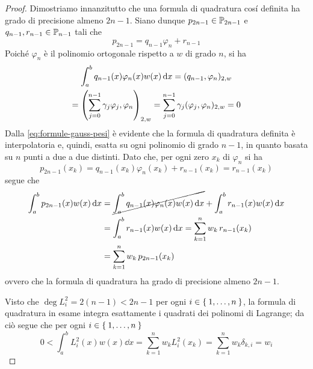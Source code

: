 	\begin{proof}
		Dimostriamo innanzitutto che una formula di quadratura cosí definita ha grado di precisione almeno \(2 n - 1\). Siano dunque \(p_{2 n - 1} \in \P_{2 n - 1}\) e \(q_{n - 1}, r_{n - 1} \in \P_{n - 1}\) tali che
		\begin{equation*}
			p_{2 n - 1} = q_{n - 1} \varphi_n + r_{n - 1}
		\end{equation*}
		Poiché \(\varphi_n\) è il polinomio ortogonale rispetto a \(w\) di grado \(n\), si ha
		\begin{multline*}
			\int_a^b q_{n - 1} (x) \varphi_n (x) w (x) \dd{x} = (q_{n - 1}, \varphi_n)_{2, w} \\
			= \qty(\sum_{j = 0}^{n - 1} \gamma_j \varphi_j, \varphi_n)_{2, w} = \sum_{j = 0}^{n - 1} \gamma_j (\varphi_j, \varphi_n)_{2, w} = 0
		\end{multline*}
		Dalla \eqref{eq:formule-gauss-pesi} è evidente che la formula di quadratura definita è interpolatoria e, quindi, esatta su ogni polinomio di grado \(n - 1\), in quanto basata su \(n\) punti a due a due distinti. Dato che, per ogni zero \(x_k\) di \(\varphi_n\) si ha
		\begin{equation*}
			p_{2 n - 1} (x_k) = q_{n - 1} (x_k) \varphi_n (x_k) + r_{n - 1} (x_k) = r_{n - 1} (x_k)
		\end{equation*}
		segue che
		\begin{equation*}
			\begin{split}
				\int_a^b p_{2 n - 1} (x) w (x) \dd{x} &= \cancel{\int_a^b q_{n - 1} (x) \varphi_n (x) w (x) \dd{x}} + \int_a^b r_{n - 1} (x) w (x) \dd{x} \\
				&= \int_a^b r_{n - 1} (x) w (x) \dd{x} = \sum_{k = 1}^n w_k \, r_{n - 1} (x_k) \\
				&= \sum_{k = 1}^n w_k \, p_{2 n - 1} (x_k)
			\end{split}
		\end{equation*}
		ovvero che la formula di quadratura ha grado di precisione almeno \(2 n - 1\).
		
		Visto che \(\deg L_i^2 = 2 (n - 1) < 2 n - 1\) per ogni \(i \in \Set{1, \dots, n}\), la formula di quadratura in esame integra esattamente i quadrati dei polinomi di Lagrange; da ciò segue che per ogni \(i \in \Set{1, \dots, n}\)
		\begin{equation*}
			0 < \int_a^b L_i^2 (x) w (x) \dd{x} = \sum_{k = 1}^n w_k L_i^2 (x_k) = \sum_{k = 1}^n w_k \delta_{k, i} = w_i
		\end{equation*}
	

\end{proof}

